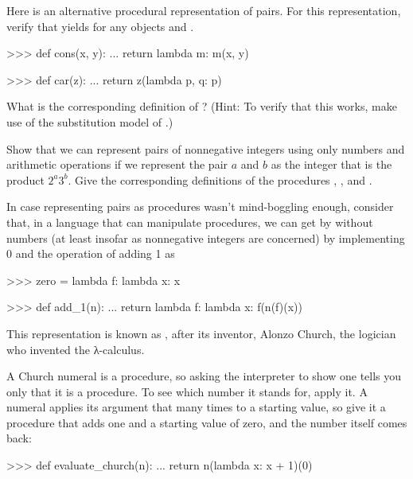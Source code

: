 \begin{exerciseGroup}
\label{Exercise 2.4}
 Here is an alternative procedural
representation of pairs.  For this representation, verify that
 yields  for any objects  and .

\begin{codeBlock}
>>> def cons(x, y):
...     return lambda m: m(x, y)

>>> def car(z):
...     return z(lambda p, q: p)
\end{codeBlock}

What is the corresponding definition of ? (Hint: To verify that this
works, make use of the substitution model of .)

\label{Exercise 2.5}
 Show that we can represent pairs of
nonnegative integers using only numbers and arithmetic operations if we
represent the pair \( a \) and \( b \) as the integer that is the product \( 2^a 3^b \).
Give the corresponding definitions of the procedures ,
, and .

\label{Exercise 2.6}
 In case representing pairs as
procedures wasn't mind-boggling enough, consider that, in a language that can
manipulate procedures, we can get by without numbers (at least insofar as
nonnegative integers are concerned) by implementing 0 and the operation of
adding 1 as

\begin{codeBlock}
>>> zero = lambda f: lambda x: x

>>> def add_1(n):
...     return lambda f: lambda x: f(n(f)(x))
\end{codeBlock}

This representation is known as , after its inventor,
Alonzo Church, the logician who invented the λ-calculus.

A Church numeral is a procedure, so asking the interpreter to show one tells
you only that it is a procedure.  To see which number it stands for, apply it.
A numeral applies its argument that many times to a starting value, so give it
a procedure that adds one and a starting value of zero, and the number itself
comes back:

\begin{codeBlock}
>>> def evaluate_church(n):
...     return n(lambda x: x + 1)(0)


\end{codeBlock}
\end{exerciseGroup}
